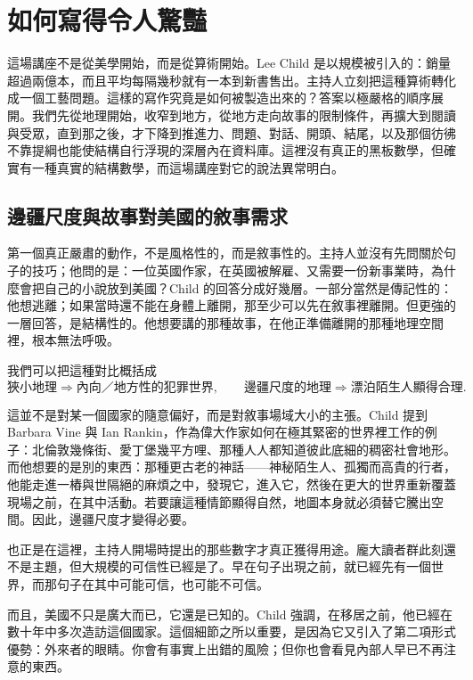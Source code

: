 \chapter{如何寫得令人驚豔}

這場講座不是從美學開始，而是從算術開始。Lee Child 是以規模被引入的：銷量超過兩億本，而且平均每隔幾秒就有一本到新書售出。主持人立刻把這種算術轉化成一個工藝問題。這樣的寫作究竟是如何被製造出來的？答案以極嚴格的順序展開。我們先從地理開始，收窄到地方，從地方走向故事的限制條件，再擴大到閱讀與受眾，直到那之後，才下降到推進力、問題、對話、開頭、結尾，以及那個彷彿不靠提綱也能使結構自行浮現的深層內在資料庫。這裡沒有真正的黑板數學，但確實有一種真實的結構數學，而這場講座對它的說法異常明白。

\section{邊疆尺度與故事對美國的敘事需求}

第一個真正嚴肅的動作，不是風格性的，而是敘事性的。主持人並沒有先問關於句子的技巧；他問的是：一位英國作家，在英國被解雇、又需要一份新事業時，為什麼會把自己的小說放到美國？Child 的回答分成好幾層。一部分當然是傳記性的：他想逃離；如果當時還不能在身體上離開，那至少可以先在敘事裡離開。但更強的一層回答，是結構性的。他想要講的那種故事，在他正準備離開的那種地理空間裡，根本無法呼吸。

我們可以把這種對比概括成
\begin{equation}
\text{狹小地理} \Longrightarrow \text{內向／地方性的犯罪世界}, \qquad
\text{邊疆尺度的地理} \Longrightarrow \text{漂泊陌生人顯得合理}.
\end{equation}

這並不是對某一個國家的隨意偏好，而是對敘事場域大小的主張。Child 提到 Barbara Vine 與 Ian Rankin，作為偉大作家如何在極其緊密的世界裡工作的例子：北倫敦幾條街、愛丁堡幾平方哩、那種人人都知道彼此底細的稠密社會地形。而他想要的是別的東西：那種更古老的神話——神秘陌生人、孤獨而高貴的行者，他能走進一樁與世隔絕的麻煩之中，發現它，進入它，然後在更大的世界重新覆蓋現場之前，在其中活動。若要讓這種情節顯得自然，地圖本身就必須替它騰出空間。因此，邊疆尺度才變得必要。

也正是在這裡，主持人開場時提出的那些數字才真正獲得用途。龐大讀者群此刻還不是主題，但大規模的可信性已經是了。早在句子出現之前，就已經先有一個世界，而那句子在其中可能可信，也可能不可信。

而且，美國不只是廣大而已，它還是已知的。Child 強調，在移居之前，他已經在數十年中多次造訪這個國家。這個細節之所以重要，是因為它又引入了第二項形式優勢：外來者的眼睛。你會有事實上出錯的風險；但你也會看見內部人早已不再注意的東西。


